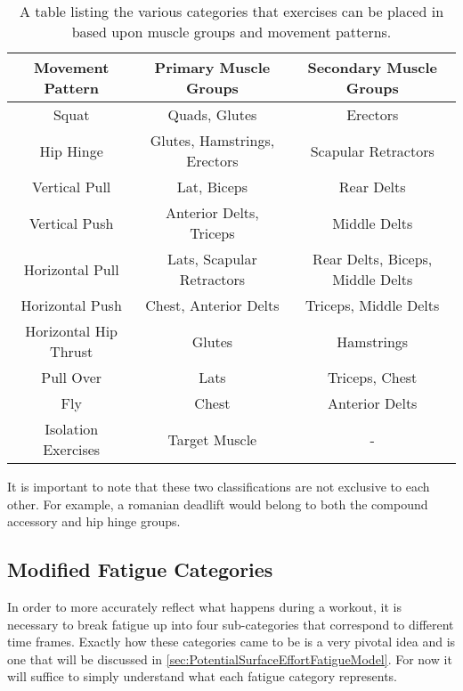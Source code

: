 \begin{table}[h]
	\centering
	\begin{tabular}{|c|c|c|}
		\hline
		Movement Pattern & Primary Muscle Groups & Secondary Muscle Groups \\
		\hline
		Squat & Quads, Glutes & Erectors \\
		Hip Hinge & Glutes, Hamstrings, Erectors & Scapular Retractors \\
		Vertical Pull & Lat, Biceps & Rear Delts \\
		Vertical Push & Anterior Delts, Triceps & Middle Delts \\
		Horizontal Pull & Lats, Scapular Retractors & Rear Delts, Biceps, Middle Delts \\
		Horizontal Push & Chest, Anterior Delts & Triceps, Middle Delts \\
		Horizontal Hip Thrust & Glutes & Hamstrings \\
		Pull Over & Lats & Triceps, Chest \\
		Fly & Chest & Anterior Delts \\
		Isolation Exercises & Target Muscle & - \\
		\hline
	\end{tabular}
	\caption{A table listing the various categories that exercises can be placed in based upon muscle groups and movement patterns.}
	\label{tab:P1_MovementPatternCategories}
\end{table}

It is important to note that these two classifications are not exclusive to each other. For example, a romanian deadlift would belong to both the compound accessory and hip hinge groups.

\subsection{Modified Fatigue Categories}
\label{sec:P1_ModifiedFatigueCategories}

In order to more accurately reflect what happens during a workout, it is necessary to break fatigue up into four sub-categories that correspond to different time frames. Exactly how these categories came to be is a very pivotal idea and is one that will be discussed in \ref{sec:PotentialSurfaceEffortFatigueModel}. For now it will suffice to simply understand what each fatigue category represents.

